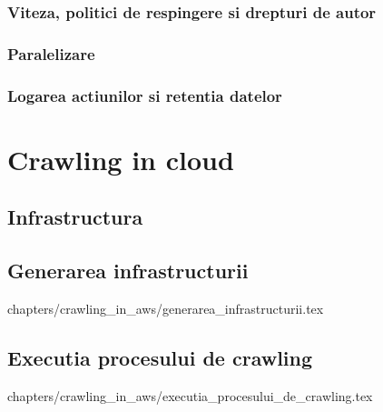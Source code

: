 \documentclass[12pt,oneside]{report}
\newcommand{\chaptertitle}[1]{\LARGE{#1}}
\begin{document}
\subsection{Viteza, politici de respingere si drepturi de autor}


\subsection{Paralelizare}


\subsection{Logarea actiunilor si retentia datelor}

\clearpage

\chapter*{\chaptertitle{Crawling in cloud}}

\clearpage

\setcounter{section}{0}

\section{Infrastructura}

\clearpage

\section{Generarea infrastructurii}
 {
	chapters/crawling_in_aws/generarea_infrastructurii.tex
}
\clearpage

\section{Executia procesului de crawling}
 {
	chapters/crawling_in_aws/executia_procesului_de_crawling.tex
}
\clearpage


\end{document}

